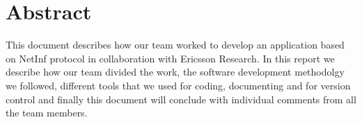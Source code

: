 \section{Abstract}
This document describes how our team worked to develop an application based on NetInf protocol in collaboration with Ericsson Research. In this report we describe how our team divided the work, the software development methodolgy we followed, different tools that we used for coding, documenting and for version control and finally this document will conclude with individual comments from all the team members.     